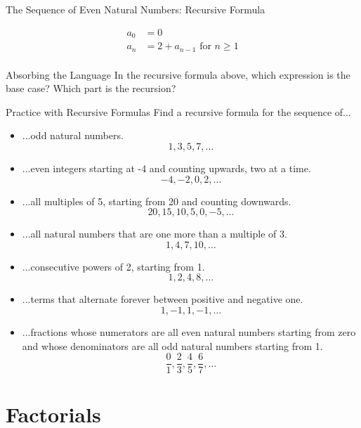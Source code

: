 \begin{example}{The Sequence of Even Natural Numbers: Recursive Formula}

\begin{align*}
a_0 &= 0 \\
a_n &= 2 + a_{n-1}\text{ for }n \geq 1\\ 
\end{align*} 

\end{example}
\begin{exercise}{Absorbing the Language \Coffeecup}
In the recursive formula above, which expression is the base case?  Which part is the recursion? 
\end{exercise}
\begin{exercise}{Practice with Recursive Formulas \Coffeecup \Coffeecup}
Find a recursive formula for the sequence of...
\begin{itemize}
\item ...odd natural numbers. $$1,3,5,7,\ldots$$
\item ...even integers starting at -4 and counting upwards, two at a time. $$-4,-2,0,2,\ldots$$
\item ...all multiples of 5, starting from 20 and counting downwards. $$20,15,10,5,0,-5,\ldots$$
\item ...all natural numbers that are one more than a multiple of 3. $$1,4,7,10,\ldots$$
\item ...consecutive powers of 2, starting from 1. $$1,2,4,8,\ldots$$
\item ...terms that alternate forever between positive and negative one. $$1,-1,1,-1,\ldots$$
\item ...fractions whose numerators are all even natural numbers starting from zero and whose denominators are all odd natural numbers starting from 1. $$\frac{0}{1},\frac{2}{3},\frac{4}{5},\frac{6}{7},\ldots$$
\solushun{}{.3in}
\end{itemize}
\end{exercise}
\section{Factorials}

